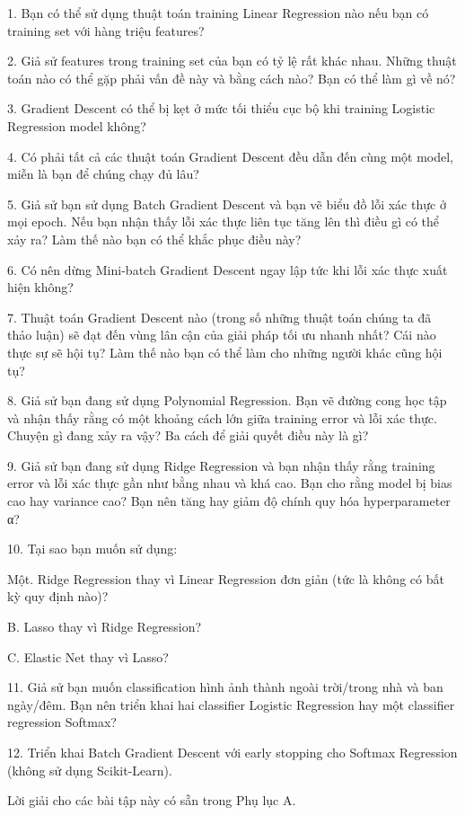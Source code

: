1. Bạn có thể sử dụng thuật toán training Linear Regression nào nếu bạn có training set với hàng triệu features?

2. Giả sử features trong training set của bạn có tỷ lệ rất khác nhau. Những thuật toán nào có thể gặp phải vấn đề này và bằng cách nào? Bạn có thể làm gì về nó?

3. Gradient Descent có thể bị kẹt ở mức tối thiểu cục bộ khi training Logistic Regression model không?

4. Có phải tất cả các thuật toán Gradient Descent đều dẫn đến cùng một model, miễn là bạn để chúng chạy đủ lâu?

5. Giả sử bạn sử dụng Batch Gradient Descent và bạn vẽ biểu đồ lỗi xác thực ở mọi epoch. Nếu bạn nhận thấy lỗi xác thực liên tục tăng lên thì điều gì có thể xảy ra? Làm thế nào bạn có thể khắc phục điều này?

6. Có nên dừng Mini-batch Gradient Descent ngay lập tức khi lỗi xác thực xuất hiện không?

7. Thuật toán Gradient Descent nào (trong số những thuật toán chúng ta đã thảo luận) sẽ đạt đến vùng lân cận của giải pháp tối ưu nhanh nhất? Cái nào thực sự sẽ hội tụ? Làm thế nào bạn có thể làm cho những người khác cũng hội tụ?

8. Giả sử bạn đang sử dụng Polynomial Regression. Bạn vẽ đường cong học tập và nhận thấy rằng có một khoảng cách lớn giữa training error và lỗi xác thực. Chuyện gì đang xảy ra vậy? Ba cách để giải quyết điều này là gì?

9. Giả sử bạn đang sử dụng Ridge Regression và bạn nhận thấy rằng training error và lỗi xác thực gần như bằng nhau và khá cao. Bạn cho rằng model bị bias cao hay variance cao? Bạn nên tăng hay giảm độ chính quy hóa hyperparameter α?

10. Tại sao bạn muốn sử dụng:

Một. Ridge Regression thay vì Linear Regression đơn giản (tức là không có bất kỳ quy định nào)?

B. Lasso thay vì Ridge Regression?

C. Elastic Net thay vì Lasso?

11. Giả sử bạn muốn classification hình ảnh thành ngoài trời/trong nhà và ban ngày/đêm. Bạn nên triển khai hai classifier Logistic Regression hay một classifier regression Softmax?

12. Triển khai Batch Gradient Descent với early stopping cho Softmax Regression (không sử dụng Scikit-Learn).

Lời giải cho các bài tập này có sẵn trong Phụ lục A.

